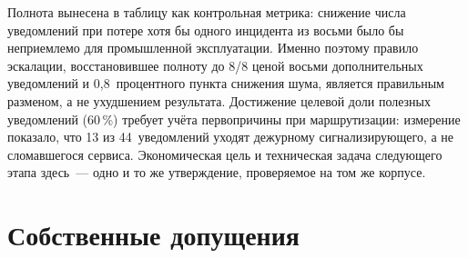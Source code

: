 \documentclass[utf8x, 12pt]{G7-32} %
\begin{document}
Полнота вынесена в таблицу как контрольная метрика: снижение числа уведомлений
при потере хотя бы одного инцидента из восьми было бы неприемлемо для
промышленной эксплуатации. Именно поэтому правило эскалации, восстановившее
полноту до 8/8 ценой восьми дополнительных уведомлений и 0,8~процентного пункта
снижения шума, является правильным разменом, а не ухудшением результата.
Достижение целевой доли полезных уведомлений (60\,\%) требует учёта
первопричины при маршрутизации: измерение показало, что 13 из 44~уведомлений
уходят дежурному сигнализирующего, а не сломавшегося сервиса. Экономическая
цель и техническая задача следующего этапа здесь~--- одно и то же утверждение,
проверяемое на том же корпусе.

\section{Собственные допущения}
\end{document}
